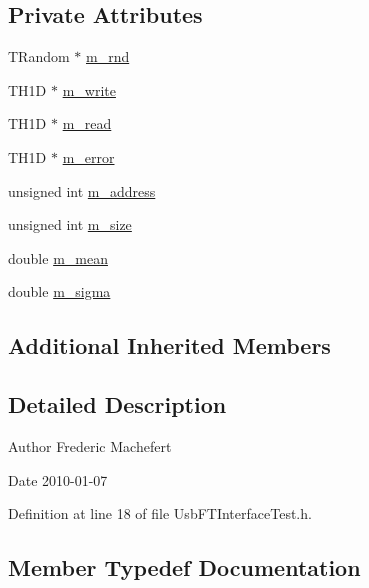 \subsection*{Private Attributes}
\begin{DoxyCompactItemize}
\item 
T\+Random $\ast$ \hyperlink{classUsbFTInterfaceTest_af4768c2ff0859d1808fe95cbe125b810}{m\+\_\+rnd}
\item 
T\+H1D $\ast$ \hyperlink{classUsbFTInterfaceTest_ab454b0a533694280200f10c97aa99f64}{m\+\_\+write}
\item 
T\+H1D $\ast$ \hyperlink{classUsbFTInterfaceTest_a6bb9dcdfe857de2aebcb3e0c11c32167}{m\+\_\+read}
\item 
T\+H1D $\ast$ \hyperlink{classUsbFTInterfaceTest_ac4efb68232e7acdf1b87278aabfbf1a6}{m\+\_\+error}
\item 
unsigned int \hyperlink{classUsbFTInterfaceTest_afab3cfd8e2bba2621583f0631471ef12}{m\+\_\+address}
\item 
unsigned int \hyperlink{classUsbFTInterfaceTest_a9028dd3c7f3533870d7c1f264a1ec1b4}{m\+\_\+size}
\item 
double \hyperlink{classUsbFTInterfaceTest_a88bd9de98a903663a21e03368aa567fc}{m\+\_\+mean}
\item 
double \hyperlink{classUsbFTInterfaceTest_a968e22a659f423b04c32a45d6d3160ea}{m\+\_\+sigma}
\end{DoxyCompactItemize}
\subsection*{Additional Inherited Members}


\subsection{Detailed Description}
\begin{DoxyAuthor}{Author}
Frederic Machefert 
\end{DoxyAuthor}
\begin{DoxyDate}{Date}
2010-\/01-\/07 
\end{DoxyDate}


Definition at line 18 of file Usb\+F\+T\+Interface\+Test.\+h.



\subsection{Member Typedef Documentation}
\mbox{\label{classUsbFTInterfaceTest_ab034b25c13b6c84815e5858d292d7635}} 
